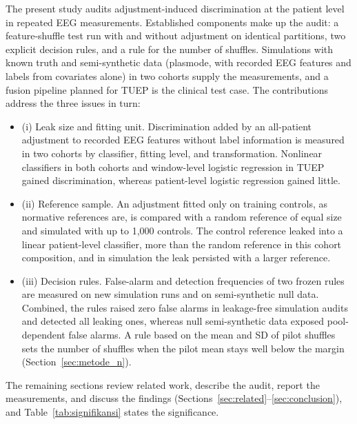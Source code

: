 \documentclass[final,1p,times]{elsarticle}
\newcommand{\tabref}[1]{Table~\ref{#1}}
\begin{document}
The present study audits adjustment-induced discrimination at the patient level in repeated EEG measurements. Established components make up the audit: a feature-shuffle test run with and without adjustment on identical partitions, two explicit decision rules, and a rule for the number of shuffles. Simulations with known truth and semi-synthetic data (plasmode, with recorded EEG features and labels from covariates alone) in two cohorts supply the measurements, and a fusion pipeline planned for TUEP is the clinical test case. The contributions address the three issues in turn:
\begin{itemize}[leftmargin=*,itemsep=0pt,topsep=2pt]
\item (i) Leak size and fitting unit. Discrimination added by an all-patient adjustment to recorded EEG features without label information is measured in two cohorts by classifier, fitting level, and transformation. Nonlinear classifiers in both cohorts and window-level logistic regression in TUEP gained discrimination, whereas patient-level logistic regression gained little.
\item (ii) Reference sample. An adjustment fitted only on training controls, as normative references are, is compared with a random reference of equal size and simulated with up to 1,000 controls. The control reference leaked into a linear patient-level classifier, more than the random reference in this cohort composition, and in simulation the leak persisted with a larger reference.
\item (iii) Decision rules. False-alarm and detection frequencies of two frozen rules are measured on new simulation runs and on semi-synthetic null data. Combined, the rules raised zero false alarms in leakage-free simulation audits and detected all leaking ones, whereas null semi-synthetic data exposed pool-dependent false alarms. A rule based on the mean and SD of pilot shuffles sets the number of shuffles when the pilot mean stays well below the margin (Section~\ref{sec:metode_n}).
\end{itemize}
The remaining sections review related work, describe the audit, report the measurements, and discuss the findings (Sections~\ref{sec:related}--\ref{sec:conclusion}), and \tabref{tab:signifikansi} states the significance.
\end{document}
